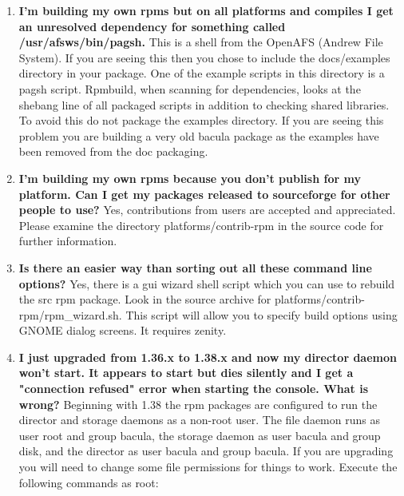 \begin{enumerate}
{\tt .rpmmacros}

in your home directory (or edit  the file if it already exists)
and add the following line:

\footnotesize
\begin{verbatim}
        %_topdir /home/myuser/redhat
        %_tmppath /tmp

\end{verbatim}
\normalsize

Another handy directive for the .rpmmacros file if you wish to suppress the
creation of debug rpm packages is:

\footnotesize
\begin{verbatim}
        %debug_package %{nil}

\end{verbatim}

\normalsize

\item
   \label{faq5}
   {\bf I'm building my own rpms but on all platforms and compiles I get an
   unresolved dependency for something called /usr/afsws/bin/pagsh.} This
   is a shell from the OpenAFS (Andrew File System).  If you are seeing
   this then you chose to include the docs/examples directory in your
   package.  One of the example scripts in this directory is a pagsh
   script.  Rpmbuild, when scanning for dependencies, looks at the shebang
   line of all packaged scripts in addition to checking shared libraries.
   To avoid this do not package the examples directory. If you are seeing this
   problem you are building a very old bacula package as the examples have been
   removed from the doc packaging.

\item
   \label{faq6}
   {\bf I'm building my own rpms because you don't publish for my platform.
    Can I get my packages released to sourceforge for other people to use?} Yes,
    contributions from users are accepted and appreciated. Please examine the
    directory platforms/contrib-rpm in the source code for further information.

\item
   \label{faq7}
   {\bf Is there an easier way than sorting out all these command line options?} Yes,
    there is a gui wizard shell script which you can use to rebuild the src rpm package.
   Look in the source archive for platforms/contrib-rpm/rpm\_wizard.sh. This script will
   allow you to specify build options using GNOME dialog screens. It requires zenity.

\item
   \label{faq8}
   {\bf I just upgraded from 1.36.x to 1.38.x and now my director daemon
won't start.  It appears to start but dies silently and I get a "connection
refused" error when starting the console.  What is wrong?} Beginning with
1.38 the rpm packages are configured to run the director and storage
daemons as a non-root user.  The file daemon runs as user root and group
bacula, the storage daemon as user bacula and group disk, and the director
as user bacula and group bacula.  If you are upgrading you will need to
change some file permissions for things to work.  Execute the following
commands as root:


\end{enumerate}

